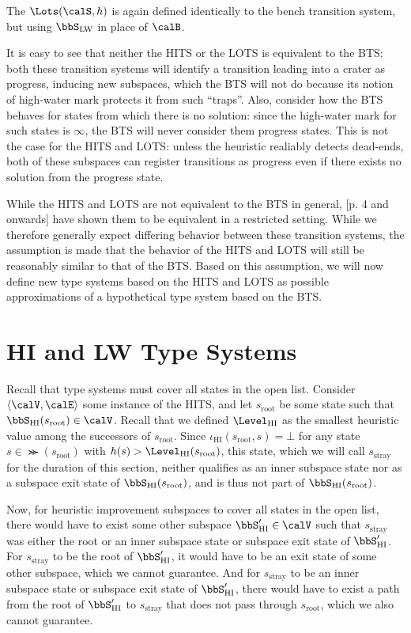 The  $\Lots(\calS,h)$ is again defined identically to the bench transition system, but using $\bbS_\text{LW}$ in place of $\calB$.

It is easy to see that neither the HITS or the LOTS is equivalent to the BTS: both these transition systems will identify a transition leading into a crater as progress, inducing new subspaces, which the BTS will not do because its notion of high-water mark protects it from such ``traps''. Also, consider how the BTS behaves for states from which there is no solution: since the high-water mark for such states is $\infty$, the BTS will never consider them progress states. This is not the case for the HITS and LOTS: unless the heuristic realiably detects dead-ends, both of these subspaces can register transitions as progress even if there exists no solution from the progress state.

While the HITS and LOTS are not equivalent to the BTS in general, [p. 4 and onwards] have shown them to be equivalent in a restricted setting. While we therefore generally expect differing behavior between these transition systems, the assumption is made that the behavior of the HITS and LOTS will still be reasonably similar to that of the BTS. Based on this assumption, we will now define new type systems based on the HITS and LOTS as possible approximations of a hypothetical type system based on the BTS.

\section{HI and LW Type Systems}

Recall that type systems must cover all states in the open list. Consider $\langle\calV,\calE\rangle$ some instance of the HITS, and let $s_\text{root}$ be some state such that $\bbS_\text{HI}(s_\text{root})\in\calV$. Recall that we defined $\Level_\text{HI}$ as the smallest heuristic value among the successors of $s_\text{root}$. Since $\iota_\text{HI}(s_\text{root},s)=\bot$ for any state $s\in\Succ(s_\text{root})$ with $h(s)>\Level_\text{HI}(s_\text{root})$, this state, which we will call $s_\text{stray}$ for the duration of this section, neither qualifies as an inner subspace state nor as a subspace exit state of $\bbS_\text{HI}(s_\text{root})$, and is thus not part of $\bbS_\text{HI}(s_\text{root})$.

Now, for heuristic improvement subspaces to cover all states in the open list, there would have to exist some other subspace $\bbS_\text{HI}'\in\calV$ such that $s_\text{stray}$ was either the root or an inner subspace state or subspace exit state of $\bbS_\text{HI}'$. For $s_\text{stray}$ to be the root of $\bbS_\text{HI}'$, it would have to be an exit state of some other subspace, which we cannot guarantee. And for $s_\text{stray}$ to be an inner subspace state or subspace exit state of $\bbS_\text{HI}'$, there would have to exist a path from the root of $\bbS_\text{HI}'$ to $s_\text{stray}$ that does not pass through $s_\text{root}$, which we also cannot guarantee.

